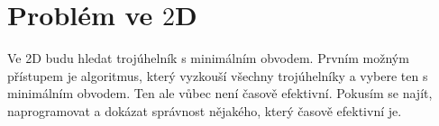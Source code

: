 \chapter{Problém ve \texorpdfstring{$2$D}{2D}}
\label{chap:problem2d}
Ve 2D budu hledat trojúhelník s minimálním obvodem. Prvním možným přístupem je algoritmus, který vyzkouší všechny trojúhelníky a vybere ten s minimálním obvodem. Ten ale vůbec není časově efektivní. Pokusím se najít, naprogramovat a dokázat správnost nějakého, který časově efektivní je. 




\clearpage
